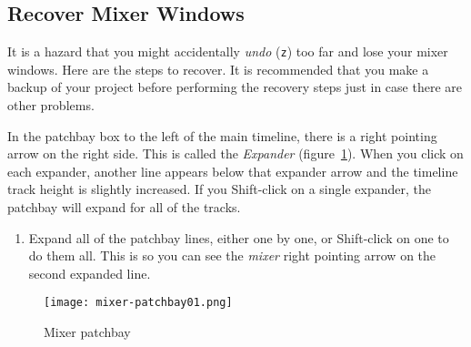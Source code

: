 \subsection{Recover Mixer Windows}%
\label{sub:recover_mixer_windows}

It is a hazard that you might accidentally \textit{undo} (\texttt{z}) too far and lose your mixer windows.  Here are the steps to recover.  It is recommended that you make a backup of your project before performing the recovery steps just in case there are other problems.

In the patchbay box to the left of the main timeline, there is a right pointing arrow on the right side.  This is called the \textit{Expander} (figure~\ref{fig:mixer-patchbay01}).  When you click on each expander, another line appears below that expander arrow and the timeline track height is slightly increased.  If you Shift-click on a single expander, the patchbay will expand for all of the tracks.

\begin{enumerate}
    \item Expand all of the patchbay lines, either one by one, or Shift-click on one to do them all. This is so you can see the \textit{mixer} right pointing arrow on the second expanded line.    
\end{enumerate}

\begin{figure}[htpb]
	\centering
	\texttt{[image: mixer-patchbay01.png]}
	\caption{Mixer  patchbay}
	\label{fig:mixer-patchbay01}
\end{figure}

